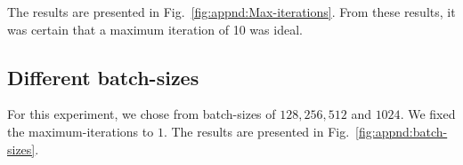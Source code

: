 The results are presented in Fig.\ \ref{fig:appnd:Max-iterations}. From these results, it was certain that a maximum iteration of 10 was ideal. 

\subsection{Different batch-sizes}
\label{appnd:batch-sizes}
For this experiment, we chose from batch-sizes of $128, 256, 512$ and $1024$. We fixed the maximum-iterations to $1$. The results are presented in Fig.\ \ref{fig:appnd:batch-sizes}.